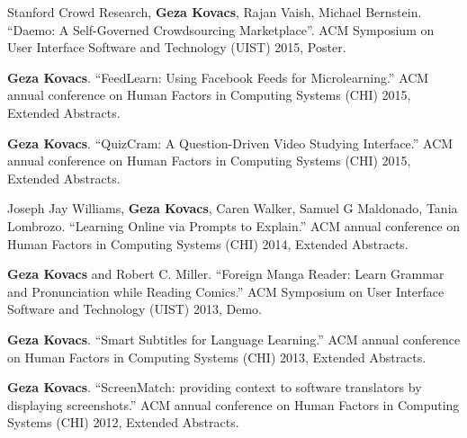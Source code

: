 \documentclass[margin,line]{resume}
\begin{document}
\begin{resume}
Stanford Crowd Research, \textbf{Geza Kovacs}, Rajan Vaish, Michael Bernstein. ``Daemo: A Self-Governed Crowdsourcing Marketplace''. ACM Symposium on User Interface Software and Technology (UIST) 2015, Poster.

\textbf{Geza Kovacs}. ``FeedLearn: Using Facebook Feeds for Microlearning.'' ACM annual conference on Human Factors in Computing Systems (CHI) 2015, Extended Abstracts. %

\textbf{Geza Kovacs}. ``QuizCram: A Question-Driven Video Studying Interface.'' ACM annual conference on Human Factors in Computing Systems (CHI) 2015, Extended Abstracts.

Joseph Jay Williams, \textbf{Geza Kovacs}, Caren Walker, Samuel G Maldonado, Tania Lombrozo. ``Learning Online via Prompts to Explain.'' ACM annual conference on Human Factors in Computing Systems (CHI) 2014, Extended Abstracts.

\textbf{Geza Kovacs} and Robert C. Miller. ``Foreign Manga Reader: Learn Grammar and Pronunciation while Reading Comics.'' ACM Symposium on User Interface Software and Technology (UIST) 2013, Demo.

\textbf{Geza Kovacs}. ``Smart Subtitles for Language Learning.'' ACM annual conference on Human Factors in Computing Systems (CHI) 2013, Extended Abstracts.%

\textbf{Geza Kovacs}. ``ScreenMatch: providing context to software translators by displaying screenshots.'' ACM annual conference on Human Factors in Computing Systems (CHI) 2012, Extended Abstracts.%


\end{resume}
\end{document}
